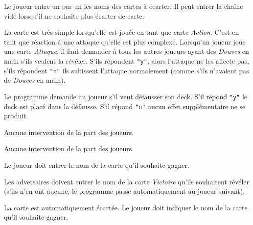 \documentclass[12pt]{td}
\begin{document}
{Le joueur entre un par un les noms des cartes à écarter. Il peut entrer la chaîne vide lorsqu'il ne souhaite plus écarter de carte.}

{La carte est très simple lorsqu'elle est jouée en tant que carte \emph{Action}. C'est en tant que réaction à une attaque qu'elle est plus complexe. Lorsqu'un joueur joue une carte \emph{Attaque}, il faut demander à tous les autres joueurs ayant des \emph{Douves} en main s'ils veulent la révéler. S'ils répondent \texttt{"y"}, alors l'attaque ne les affecte pas, s'ils répondent \texttt{"n"} ils subissent l'attaque normalement (comme s'ils n'avaient pas de \emph{Douves} en main).}

{Le programme demande au joueur s'il veut défausser son deck. S'il répond \texttt{"y"} le deck est placé dans la défausse. S'il répond \texttt{"n"} aucun effet supplémentaire ne se produit.}

{Aucune intervention de la part des joueurs.}

{Aucune intervention de la part des joueurs.}

{Le joueur doit entrer le nom de la carte qu'il souhaite gagner.}

{Les adversaires doivent entrer le nom de la carte \emph{Victoire} qu'ils souhaitent révéler (s'ils n'en ont aucune, le programme passe automatiquement au joueur suivant).}

{La carte est automatiquement écartée. Le joueur doit indiquer le nom de la carte qu'il souhaite gagner.}
\end{document}
